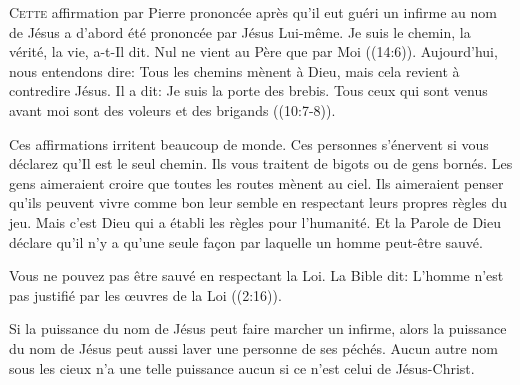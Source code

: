 
\lettrine{C}{ette} affirmation par Pierre
 \ocadr prononcée après qu'il eut guéri un infirme au nom de Jésus \fcadr{}
 a d'abord été prononcée par Jésus Lui-même.
 \Og Je suis le chemin, la vérité, la vie, a-t-Il dit.
 Nul ne vient au Père que par Moi \Fg{} 
 ((14:6)).
 Aujourd'hui, nous entendons dire: 
 \Og Tous les chemins mènent à Dieu, \Fg{} 
 mais cela revient à contredire Jésus. Il a dit: 
 \Og Je suis la porte des brebis. Tous ceux qui sont venus avant moi
 sont des voleurs et des brigands \Fg{} ((10:7-8)).

Ces affirmations irritent beaucoup de monde.
 Ces personnes s'énervent si vous déclarez qu'Il est le seul chemin.
 Ils vous traitent de bigots ou de gens bornés.
 Les gens aimeraient croire que toutes les routes mènent au ciel.
 Ils aimeraient penser qu'ils peuvent vivre comme bon leur semble
 en respectant leurs propres règles du jeu.
 Mais c'est Dieu qui a établi les règles pour l'humanité.
 Et la Parole de Dieu déclare qu'il n'y a qu'une seule fa\c{c}on
 par laquelle un homme peut-être sauvé.


Vous ne pouvez pas être sauvé en respectant la Loi.
 La Bible dit: 
 \Og L'homme n'est pas justifié par les \oe{}uvres de la Loi \Fg{}
 ((2:16)).

Si la puissance du nom de Jésus peut faire marcher un infirme,
 alors la puissance du nom de Jésus peut aussi laver une personne
 de ses péchés. Aucun autre nom sous les cieux n'a une telle puissance
 \ocadr aucun si ce n'est celui de Jésus-Christ.

\dvrule






